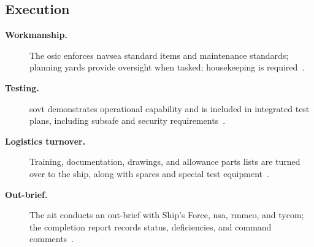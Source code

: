 \documentclass[../main.tex]{subfiles}
\begin{document}
\subsection{Execution}
\begin{description}
  \item[\textbf{Workmanship.}] The \ac{osic} enforces \ac{navsea} standard items and maintenance standards; planning yards provide oversight when tasked; housekeeping is required~\autocite{edo-4-1-4-ait-fundamentals-2025}.
  \item[\textbf{Testing.}] \ac{sovt} demonstrates operational capability and is included in integrated test plans, including \ac{subsafe} and security requirements~\autocite{edo-4-1-4-ait-fundamentals-2025}.
  \item[\textbf{Logistics turnover.}] Training, documentation, drawings, and allowance parts lists are turned over to the ship, along with spares and special test equipment~\autocite{edo-4-1-4-ait-fundamentals-2025}.
  \item[\textbf{Out-brief.}] The \ac{ait} conducts an out-brief with Ship's Force, \ac{nsa}, \ac{rmmco}, and \ac{tycom}; the completion report records status, deficiencies, and command comments~\autocite{edo-4-1-4-ait-fundamentals-2025}.
\end{description}
\end{document}
